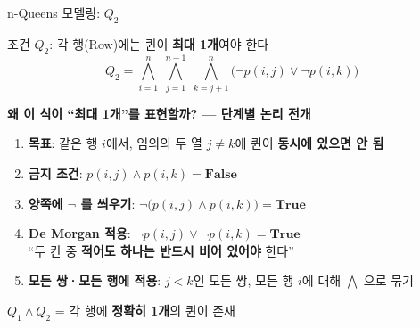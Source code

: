 \documentclass[10.5pt,compress]{beamer}
\begin{document}
\begin{frame}[t]{n-Queens 모델링: $Q_2$}
    \footnotesize

    \begin{alertblock}{조건 $Q_2$: 각 행(Row)에는 퀸이 \textbf{최대 1개}여야 한다}
        \[
            Q_2 = \bigwedge_{i=1}^{n}\; \bigwedge_{j=1}^{n-1}\; \bigwedge_{k=j+1}^{n}
            \bigl(\neg p(i,j) \lor \neg p(i,k)\bigr)
        \]
    \end{alertblock}

    \vspace{0.08cm}
    \textbf{왜 이 식이 ``최대 1개''를 표현할까? — 단계별 논리 전개}

    \begin{block}{}
        \scriptsize
        \begin{enumerate}\setlength\itemsep{0.25em}
            \item \textbf{목표}: 같은 행 $i$에서, 임의의 두 열 $j \neq k$에 퀸이 \textbf{동시에 있으면 안 됨}
            \item \textbf{금지 조건}: $p(i,j) \land p(i,k) = \mathbf{False}$
            \item \textbf{양쪽에 $\neg$ 를 씌우기}:
                  $\neg\bigl(p(i,j) \land p(i,k)\bigr) = \mathbf{True}$
            \item \textbf{De Morgan 적용}:
                  $\neg p(i,j) \lor \neg p(i,k) = \mathbf{True}$\\
                  ``두 칸 중 \textbf{적어도 하나는 반드시 비어 있어야} 한다''
            \item \textbf{모든 쌍·모든 행에 적용}: $j{<}k$인 모든 쌍, 모든 행 $i$에 대해 $\bigwedge$ 으로 묶기
        \end{enumerate}
    \end{block}

    \vspace{0.04cm}
    \begin{exampleblock}{}
        \centering\footnotesize
        $Q_1 \land Q_2$ = 각 행에 \textbf{정확히 1개}의 퀸이 존재
    \end{exampleblock}
\end{frame}
\end{document}
